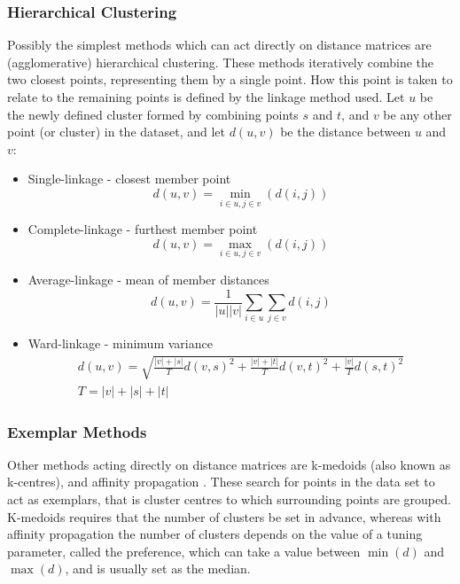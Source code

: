 \documentclass[10pt]{article}
\begin{document}
\subsubsection{Hierarchical Clustering}
Possibly the simplest methods which can act directly on distance matrices are (agglomerative) hierarchical clustering. These methods iteratively combine the two closest points, representing them by a single point. How this point is taken to relate to the remaining points is defined by the linkage method used. Let $u$ be the newly defined cluster formed by combining points $s$ and $t$, and $v$ be any other point (or cluster) in the dataset, and let $d(u,v)$ be the distance between $u$ and $v$:
\begin{itemize}
	\item Single-linkage - closest member point 
		\begin{equation*}
		d(u,v)=\min_{i \in u, j \in v} (d(i,j))
		\end{equation*}
\item Complete-linkage - furthest member point 
		\begin{equation*}
		d(u,v)=\max_{i \in u, j \in v} (d(i,j))
		\end{equation*}

	\item Average-linkage - mean of member distances
		\begin{equation*}
		d(u,v)=\frac{1}{\left|{u}\right|\left|{v}\right|}\sum_{i \in u}\sum_{j \in v} d(i,j)
		\end{equation*}

	\item Ward-linkage - minimum variance
		\begin{align*}
		d(u,v)=\sqrt{ \frac{\left|v\right| +  \left|s\right|}{T}d(v,s)^2 + \frac{\left|v\right| +  \left|t\right|}{T}d(v,t)^2 + \frac{\left|v\right|}{T}d(s,t)^2} \\
		T=\left|v\right| +  \left|s\right| + \left|t\right|
		\end{align*}
	
\end{itemize}


\subsubsection{Exemplar Methods}
Other methods acting directly on distance matrices are k-medoids (also known as k-centres), and affinity propagation \citep{Frey:2007hs}. These search for points in the data set to act as exemplars, that is cluster centres to which surrounding points are grouped. K-medoids requires that the number of clusters be set in advance, whereas with affinity propagation the number of clusters depends on the value of a tuning parameter, called the preference, which can take a value between $\min(d)$ and $\max(d)$, and is usually set as the median.
\end{document}
